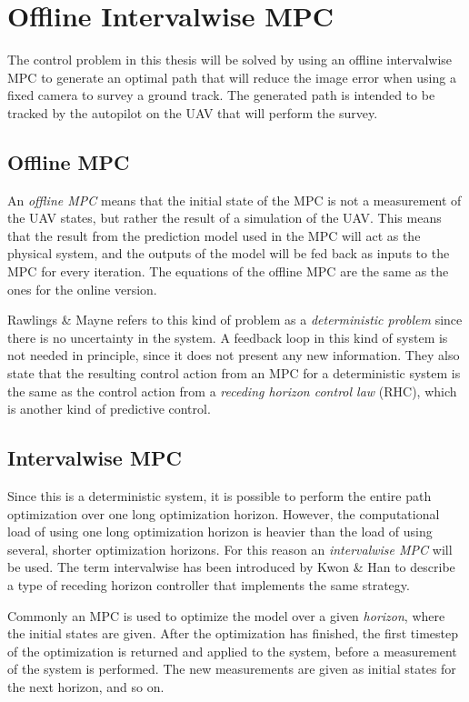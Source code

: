 \section{Offline Intervalwise MPC}
\label{sec:offline_intervalwise}

The control problem in this thesis will be solved by using an offline intervalwise MPC to generate an optimal path that will reduce the image error when using a fixed camera to survey a ground track. The generated path is intended to be tracked by the autopilot on the UAV that will perform the survey.

\subsection{Offline MPC} 

An \textit{offline MPC} means that the initial state of the MPC is not a measurement of the UAV states, but rather the result of a simulation of the UAV. This means that the result from the prediction model used in the MPC will act as the physical system, and the outputs of the model will be fed back as inputs to the MPC for every iteration. The equations of the offline MPC are the same as the ones for the online version.

Rawlings \& Mayne \cite{mpcMAYNE} refers to this kind of problem as a \textit{deterministic problem} since there is no uncertainty in the system. A feedback loop in this kind of system is not needed in principle, since it does not present any new information. They also state that the resulting control action from an MPC for a deterministic system is the same as the control action from a \textit{receding horizon control law} (RHC), which is another kind of predictive control.

\subsection{Intervalwise MPC}

Since this is a deterministic system, it is possible to perform the entire path optimization over one long optimization horizon. However, the computational load of using one long optimization horizon is heavier than the load of using several, shorter optimization horizons. For this reason an \textit{intervalwise MPC} will be used. The term intervalwise has been introduced by Kwon \& Han \cite{rhcKWON} to describe a type of receding horizon controller that implements the same strategy.

Commonly an MPC is used to optimize the model over a given \textit{horizon}, where the initial states are given. After the optimization has finished, the first timestep of the optimization is returned and applied to the system, before a measurement of the system is performed. The new measurements are given as initial states for the next horizon, and so on.

